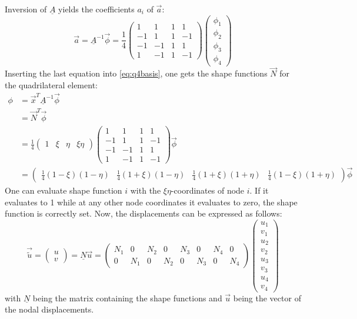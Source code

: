   Inversion of $\underline{A}$ yields the coefficients $a_i$ of $\vec{a}$:
  \begin{equation}
  \vec{a} = \underline{A}^{-1}\vec{\phi} = \frac{1}{4} \begin{pmatrix}
  1&1&1&1\\
  -1&1&1&-1\\
  -1&-1&1&1\\
  1&-1&1&-1
  \end{pmatrix} \begin{pmatrix}
  \phi_1\\\phi_2\\\phi_3\\\phi_4
  \end{pmatrix}
  \end{equation}
  Inserting the last equation into \eqref{eq:q4basis}, one gets the shape functions $\vec{N}$ for the quadrilateral element:
  \begin{align}
  \phi &= \vec{x}^T\underline{A}^{-1}\vec{\phi} \nonumber\\
    &= \vec{N}^T\vec{\phi} \nonumber\\
    &= \frac{1}{4} \begin{pmatrix}
    1&\xi&\eta&\xi\eta
    \end{pmatrix} \begin{pmatrix}
    1&1&1&1\\
    -1&1&1&-1\\
    -1&-1&1&1\\
    1&-1&1&-1
    \end{pmatrix} \vec{\phi} \nonumber\\
    &= \begin{pmatrix}
    \frac{1}{4}(1-\xi)(1-\eta)&\frac{1}{4}(1+\xi)(1-\eta)&\frac{1}{4}(1+\xi)(1+\eta)&\frac{1}{4}(1-\xi)(1+\eta)
    \end{pmatrix} \vec{\phi}
  \end{align}
  One can evaluate shape function $i$ with the $\xi\eta$-coordinates of node $i$. If it evaluates to 1 while at any other node coordinates it evaluates to zero, the shape function is correctly set. Now, the displacements can be expressed as follows:
  \begin{equation}
  \vec{\tilde{u}} = \begin{pmatrix}
  u\\v
  \end{pmatrix} = \underline{N}\vec{u} = \begin{pmatrix}
  N_1&0&N_2&0&N_3&0&N_4&0\\
  0&N_1&0&N_2&0&N_3&0&N_4
  \end{pmatrix} \begin{pmatrix}
  u_1\\v_1\\u_2\\v_2\\u_3\\v_3\\u_4\\v_4
  \end{pmatrix}
  \end{equation}
  with $\underline{N}$ being the matrix containing the shape functions and $\vec{u}$ being the vector of the nodal displacements.
  
